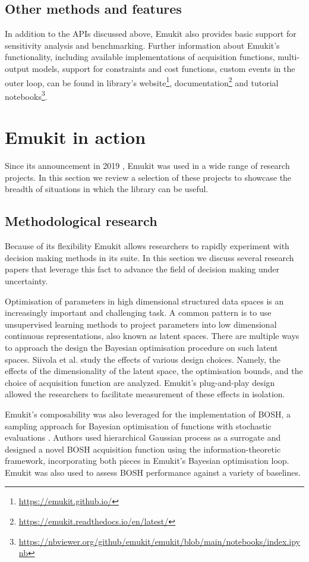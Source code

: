 \subsection{Other methods and features}
In addition to the APIs discussed above, Emukit also provides basic support for sensitivity analysis and benchmarking. Further information about Emukit's functionality, including available implementations of acquisition functions, multi-output models, support for constraints and cost functions, custom events in the outer loop, can be found in library's website\footnote{\url{https://emukit.github.io/}}, documentation\footnote{\url{https://emukit.readthedocs.io/en/latest/}} and tutorial notebooks\footnote{\url{https://nbviewer.org/github/emukit/emukit/blob/main/notebooks/index.ipynb}}. 

\section{Emukit in action}
Since its announcement in 2019 \cite{paleyes2019emulation}, Emukit was used in a wide range of research projects. In this section we review a selection of these projects to showcase the breadth of situations in which the library can be useful.

\subsection{Methodological research}
Because of its flexibility Emukit allows researchers to rapidly experiment with decision making methods in its suite. In this section we discuss several research papers that leverage this fact to advance the field of decision making under uncertainty.

Optimisation of parameters in high dimensional structured data spaces is an increasingly important and challenging task. A common pattern is to use unsupervised learning methods to project parameters into low dimensional continuous representations, also known as latent spaces. There are multiple ways to approach the design the Bayesian optimisation procedure on such latent spaces. Siivola et al. \cite{siivola2021good} study the effects of various design choices. Namely, the effects of the dimensionality of the latent space, the optimisation bounds, and the choice of acquisition function are analyzed. Emukit's plug-and-play design allowed the researchers to facilitate measurement of these effects in isolation.

Emukit's composability was also leveraged for the implementation of BOSH, a sampling approach for Bayesian optimisation of functions with stochastic evaluations \cite{moss2020bosh}. Authors used hierarchical Gaussian process as a surrogate and designed a novel BOSH acquisition function using the information-theoretic framework, incorporating both pieces in Emukit's Bayesian optimisation loop. Emukit was also used to assess BOSH performance against a variety of baselines.

